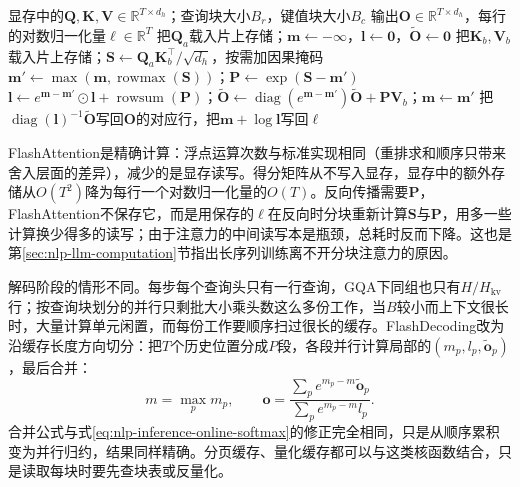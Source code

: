 \begin{algorithm}
  \label{alg:nlp-inference-flash}
  \begin{algorithmic}[1]
    \Require 显存中的$\bm Q,\bm K,\bm V\in\mathbb R^{T\times d_h}$；查询块大小$B_r$，键值块大小$B_c$
    \Ensure 输出$\bm O\in\mathbb R^{T\times d_h}$，每行的对数归一化量$\bm\ell\in\mathbb R^{T}$
      \State 把$\bm Q_a$载入片上存储；$\bm m\gets-\infty$，$\bm l\gets\bm 0$，$\tilde{\bm O}\gets\bm 0$
        \State 把$\bm K_b,\bm V_b$载入片上存储；$\bm S\gets\bm Q_a\bm K_b^{\top}/\sqrt{d_h}$，按需加因果掩码
        \State $\bm m'\gets\max(\bm m,\operatorname{rowmax}(\bm S))$；$\bm P\gets\exp(\bm S-\bm m')$
        \State $\bm l\gets e^{\bm m-\bm m'}\odot\bm l+\operatorname{rowsum}(\bm P)$；$\tilde{\bm O}\gets\operatorname{diag}(e^{\bm m-\bm m'})\tilde{\bm O}+\bm P\bm V_b$；$\bm m\gets\bm m'$
      \EndFor
      \State 把$\operatorname{diag}(\bm l)^{-1}\tilde{\bm O}$写回$\bm O$的对应行，把$\bm m+\log\bm l$写回$\bm\ell$
    \EndFor
  \end{algorithmic}
\end{algorithm}

FlashAttention是精确计算：浮点运算次数与标准实现相同（重排求和顺序只带来舍入层面的差异），减少的是显存读写。得分矩阵从不写入显存，显存中的额外存储从$O(T^2)$降为每行一个对数归一化量的$O(T)$。反向传播需要$\bm P$，FlashAttention不保存它，而是用保存的$\bm\ell$在反向时分块重新计算$\bm S$与$\bm P$，用多一些计算换少得多的读写；由于注意力的中间读写本是瓶颈，总耗时反而下降。这也是第\ref{sec:nlp-llm-computation}节指出长序列训练离不开分块注意力的原因。

解码阶段的情形不同。每步每个查询头只有一行查询，GQA下同组也只有$H/H_{\mathrm{kv}}$行；按查询块划分的并行只剩批大小乘头数这么多份工作，当$B$较小而上下文很长时，大量计算单元闲置，而每份工作要顺序扫过很长的缓存。FlashDecoding改为沿缓存长度方向切分：把$T$个历史位置分成$P$段，各段并行计算局部的$(m_p,l_p,\tilde{\bm o}_p)$，最后合并：
\begin{equation}
 m=\max_pm_p,\qquad
 \bm o=\frac{\sum_pe^{m_p-m}\tilde{\bm o}_p}{\sum_pe^{m_p-m}l_p}.
 \label{eq:nlp-inference-split-merge}
\end{equation}
合并公式与式\eqref{eq:nlp-inference-online-softmax}的修正完全相同，只是从顺序累积变为并行归约，结果同样精确。分页缓存、量化缓存都可以与这类核函数结合，只是读取每块时要先查块表或反量化。

